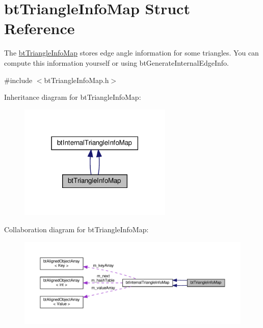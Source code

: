 \hypertarget{structbtTriangleInfoMap}{}\section{bt\+Triangle\+Info\+Map Struct Reference}
\label{structbtTriangleInfoMap}


The \hyperlink{structbtTriangleInfoMap}{bt\+Triangle\+Info\+Map} stores edge angle information for some triangles. You can compute this information yourself or using bt\+Generate\+Internal\+Edge\+Info.  




{\ttfamily \#include $<$bt\+Triangle\+Info\+Map.\+h$>$}



Inheritance diagram for bt\+Triangle\+Info\+Map\+:
\nopagebreak
\begin{figure}[H]
\begin{center}
\leavevmode
\includegraphics[width=207pt]{structbtTriangleInfoMap__inherit__graph}
\end{center}
\end{figure}


Collaboration diagram for bt\+Triangle\+Info\+Map\+:
\nopagebreak
\begin{figure}[H]
\begin{center}
\leavevmode
\includegraphics[width=350pt]{structbtTriangleInfoMap__coll__graph}
\end{center}
\end{figure}
